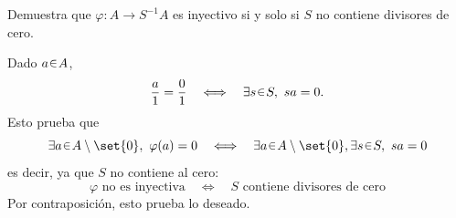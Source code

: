 \begin{ejer}
Demuestra que $\varphi\colon A\to S^{-1}A$ es inyectivo si y solo si $S$ no contiene divisores de cero.
\end{ejer}
\begin{sol}
Dado $a\en A$,
\[
\frac{a}{1}=\frac{0}{1}
\quad\Longleftrightarrow\quad
\exists s\en S,\ sa=0.
\]
Esto prueba que
\[
\exists a\en A\setminus\set{0},\ \varphi(a)=0
\quad\Longleftrightarrow\quad
\exists a\en A\setminus\set{0},\exists s\en S,\ sa=0
\]
es decir, ya que $S$ no contiene al cero:
\[
\varphi\text{ no es inyectiva}
\quad\Longleftrightarrow\quad
S\text{ contiene divisores de cero}
\]
Por contraposición, esto prueba lo deseado.
\end{sol}
